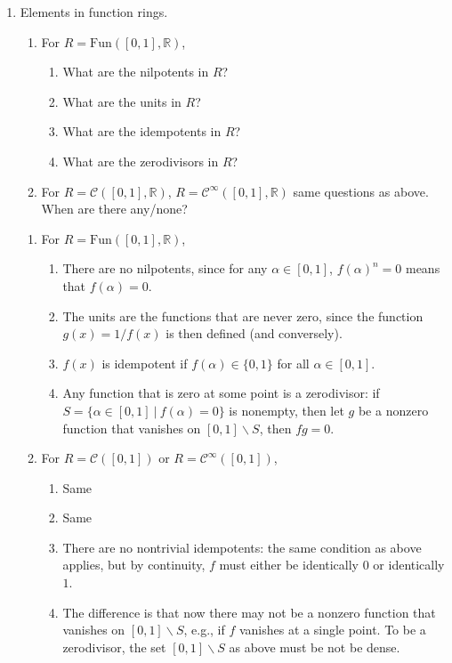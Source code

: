 \documentclass[12pt]{amsart}
\newcommand{\R}{\mathbb{R}}
\newcommand{\solution}[1]{\ifthenelse {\equal{\displaysol}{1}} {\begin{framed}{\color{meretale}\noindent #1}\end{framed}} { \ }}
\newcommand\itemB{\stepcounter{enumi}\item[(\theenumi)]}
\begin{document}
\begin{enumerate}
\itemB Elements in function rings. 
\begin{enumerate}
\item For $R=\mathrm{Fun}([0,1],\R)$,
\vspace{-4mm}
\begin{multicols}{2}
\begin{enumerate}
\item What are the nilpotents in $R$?
\item What are the units in $R$?
\item What are the idempotents in $R$?
\item What are the zerodivisors in $R$?
\end{enumerate}
\end{multicols}
\vspace{-4mm}
\item For $R = \mathcal{C}([0,1],\R)$, $R=\mathcal{C}^\infty([0,1],\R)$ same questions as above. When are there any/none?
\end{enumerate}
\solution{ 
\begin{enumerate}
\item For $R=\mathrm{Fun}([0,1],\R)$,
\begin{enumerate}
\item There are no nilpotents, since for any $\alpha\in [0,1]$, $f(\alpha)^n=0$ means that $f(\alpha)=0$.
\item The units are the functions that are never zero, since the function $g(x)=1/f(x)$ is then defined (and conversely).
\item $f(x)$ is idempotent if $f(\alpha)\in \{0,1\}$ for all $\alpha\in [0,1]$.
\item Any function that is zero at some point is a zerodivisor: if $S=\{\alpha\in [0,1] \ | \ f(\alpha)=0\}$ is nonempty,  then let $g$ be a nonzero function that vanishes on $[0,1] \smallsetminus S$, then $fg=0$.
\end{enumerate}
\item For $R = \mathcal{C}([0,1])$ or $R=\mathcal{C}^\infty([0,1])$,
\begin{enumerate}
\item Same
\item Same
\item There are no nontrivial idempotents: the same condition as above applies, but by continuity, $f$ must either be identically $0$ or identically $1$.
\item The difference is that now there may not be a nonzero function that vanishes on $[0,1] \smallsetminus S$, e.g., if $f$ vanishes at a single point. To be a zerodivisor, the set $[0,1] \smallsetminus S$ as above must be not be dense.
\end{enumerate}
\end{enumerate}
}






\end{enumerate}
\end{document}
